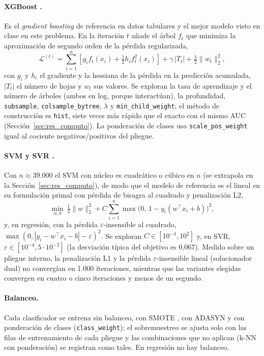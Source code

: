 \documentclass[pdflatex,sn-mathphys-num]{sn-jnl}
\begin{document}
\paragraph{XGBoost \cite{chen2016xgboost}.}
Es el \textit{gradient boosting} de referencia en datos tabulares y el mejor modelo visto en clase en este problema. En la iteración $t$ añade el árbol $f_t$ que minimiza la aproximación de segundo orden de la pérdida regularizada,
\begin{equation}
\mathcal{L}^{(t)}=\sum_{i=1}^{n}\left[g_i f_t(x_i)+\tfrac{1}{2}h_i f_t^2(x_i)\right]+\gamma\,|T_t|+\tfrac{\lambda}{2}\|w_t\|_2^2,
\end{equation}
con $g_i$ y $h_i$ el gradiente y la hessiana de la pérdida en la predicción acumulada, $|T_t|$ el número de hojas y $w_t$ sus valores. Se exploran la tasa de aprendizaje y el número de árboles (ambos en log, porque interactúan), la profundidad, \texttt{subsample}, \texttt{colsample\_bytree}, $\lambda$ y \texttt{min\_child\_weight}; el método de construcción es \texttt{hist}, siete veces más rápido que el exacto con el mismo AUC (Sección~\ref{sec:res_computo}). La ponderación de clases usa \texttt{scale\_pos\_weight} igual al cociente negativos/positivos del pliegue.

\paragraph{SVM y SVR \cite{cortes1995svm}.}
Con $n\approx39.000$ el SVM con núcleo es cuadrático o cúbico en $n$ (se extrapola en la Sección~\ref{sec:res_computo}), de modo que el modelo de referencia es el lineal en su formulación primal con pérdida de bisagra al cuadrado y penalización L2,
\begin{equation}
\min_{w,b}\ \tfrac{1}{2}\|w\|_2^2+C\sum_{i=1}^{n}\max\!\big(0,\,1-y_i(w^\top x_i+b)\big)^2,
\end{equation}
y, en regresión, con la pérdida $\varepsilon$-insensible al cuadrado, $\max(0,|y_i-w^\top x_i-b|-\varepsilon)^2$. Se exploran $C\in[10^{-4},10^{2}]$ y, en SVR, $\varepsilon\in[10^{-4},5\cdot10^{-2}]$ (la desviación típica del objetivo es 0,067). Medido sobre un pliegue interno, la penalización L1 y la pérdida $\varepsilon$-insensible lineal (solucionador dual) no convergían en 1.000 iteraciones, mientras que las variantes elegidas convergen en cuatro o cinco iteraciones y menos de un segundo.

\paragraph{Balanceo.}
Cada clasificador se entrena sin balanceo, con SMOTE \cite{chawla2002smote}, con ADASYN \cite{he2008adasyn} y con ponderación de clases (\texttt{class\_weight}); el sobremuestreo se ajusta solo con las filas de entrenamiento de cada pliegue y las combinaciones que no aplican (k-NN con ponderación) se registran como tales. En regresión no hay balanceo.
\end{document}
